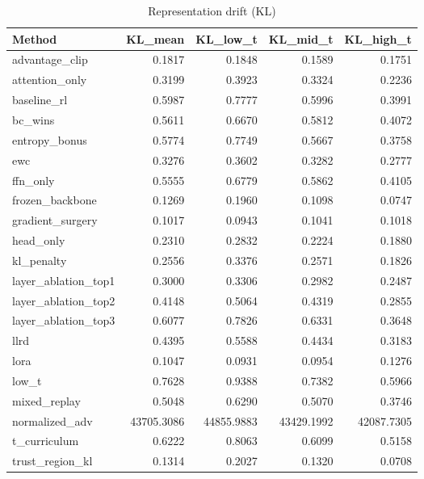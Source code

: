 \begin{table}[htbp]
\centering
\caption{Representation drift (KL)}
\label{tab:repr-drift}
\begin{tabular}{lrrrr}
\toprule
\textbf{Method} & \textbf{KL\_mean} & \textbf{KL\_low\_t} & \textbf{KL\_mid\_t} & \textbf{KL\_high\_t} \\
\midrule
advantage\_clip & 0.1817 & 0.1848 & 0.1589 & 0.1751 \\
attention\_only & 0.3199 & 0.3923 & 0.3324 & 0.2236 \\
baseline\_rl & 0.5987 & 0.7777 & 0.5996 & 0.3991 \\
bc\_wins & 0.5611 & 0.6670 & 0.5812 & 0.4072 \\
entropy\_bonus & 0.5774 & 0.7749 & 0.5667 & 0.3758 \\
ewc & 0.3276 & 0.3602 & 0.3282 & 0.2777 \\
ffn\_only & 0.5555 & 0.6779 & 0.5862 & 0.4105 \\
frozen\_backbone & 0.1269 & 0.1960 & 0.1098 & 0.0747 \\
gradient\_surgery & 0.1017 & 0.0943 & 0.1041 & 0.1018 \\
head\_only & 0.2310 & 0.2832 & 0.2224 & 0.1880 \\
kl\_penalty & 0.2556 & 0.3376 & 0.2571 & 0.1826 \\
layer\_ablation\_top1 & 0.3000 & 0.3306 & 0.2982 & 0.2487 \\
layer\_ablation\_top2 & 0.4148 & 0.5064 & 0.4319 & 0.2855 \\
layer\_ablation\_top3 & 0.6077 & 0.7826 & 0.6331 & 0.3648 \\
llrd & 0.4395 & 0.5588 & 0.4434 & 0.3183 \\
lora & 0.1047 & 0.0931 & 0.0954 & 0.1276 \\
low\_t & 0.7628 & 0.9388 & 0.7382 & 0.5966 \\
mixed\_replay & 0.5048 & 0.6290 & 0.5070 & 0.3746 \\
normalized\_adv & 43705.3086 & 44855.9883 & 43429.1992 & 42087.7305 \\
t\_curriculum & 0.6222 & 0.8063 & 0.6099 & 0.5158 \\
trust\_region\_kl & 0.1314 & 0.2027 & 0.1320 & 0.0708 \\
\bottomrule
\end{tabular}
\end{table}